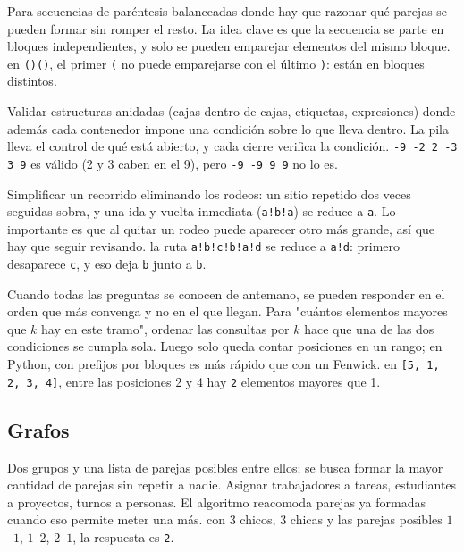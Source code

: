 Para secuencias de paréntesis balanceadas donde hay que razonar qué parejas se
pueden formar sin romper el resto. La idea clave es que la secuencia se parte en
bloques independientes, y solo se pueden emparejar elementos del mismo bloque.
\ej en \texttt{()()}, el primer \texttt{(} no puede emparejarse con el último
\texttt{)}: están en bloques distintos.

Validar estructuras anidadas (cajas dentro de cajas, etiquetas, expresiones) donde
además cada contenedor impone una condición sobre lo que lleva dentro. La pila
lleva el control de qué está abierto, y cada cierre verifica la condición.
\ej \texttt{-9 -2 2 -3 3 9} es válido (2 y 3 caben en el 9), pero \texttt{-9 -9 9
9} no lo es.

Simplificar un recorrido eliminando los rodeos: un sitio repetido dos veces seguidas
sobra, y una ida y vuelta inmediata (\texttt{a!b!a}) se reduce a \texttt{a}. Lo importante es que al quitar un rodeo puede aparecer
otro más grande, así que hay que seguir revisando.
\ej la ruta \texttt{a!b!c!b!a!d} se reduce a \texttt{a!d}: primero desaparece
\texttt{c}, y eso deja \texttt{b} junto a \texttt{b}.

Cuando todas las preguntas se conocen de antemano, se pueden responder en el orden
que más convenga y no en el que llegan. Para "cuántos elementos mayores que $k$ hay
en este tramo", ordenar las consultas por $k$ hace que una de las dos condiciones se
cumpla sola. Luego solo queda contar posiciones en un rango; en
Python, con prefijos por bloques es más rápido que con un Fenwick.
\ej en \texttt{[5, 1, 2, 3, 4]}, entre las posiciones 2 y 4 hay \texttt{2}
elementos mayores que 1.

\subsection*{Grafos}

Dos grupos y una lista de parejas posibles entre ellos; se busca formar la mayor
cantidad de parejas sin repetir a nadie. Asignar trabajadores a tareas, estudiantes
a proyectos, turnos a personas. El algoritmo reacomoda parejas ya formadas cuando
eso permite meter una más.
\ej con 3 chicos, 3 chicas y las parejas posibles $1$--$1$, $1$--$2$, $2$--$1$,
la respuesta es \texttt{2}.

